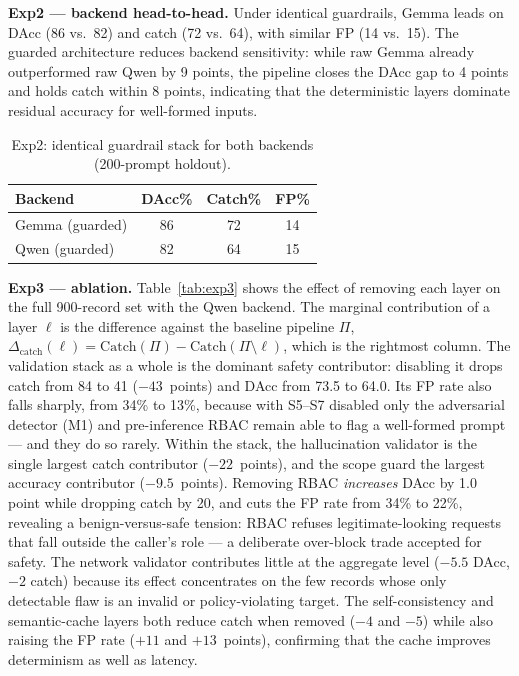 \documentclass[conference]{IEEEtran}
\begin{document}
\textbf{Exp2 --- backend head-to-head.} Under identical guardrails, Gemma leads on DAcc (86 vs.\ 82) and catch (72 vs.\ 64), with similar FP (14 vs.\ 15). The guarded architecture reduces backend sensitivity: while raw Gemma already outperformed raw Qwen by 9 points, the pipeline closes the DAcc gap to 4 points and holds catch within 8 points, indicating that the deterministic layers dominate residual accuracy for well-formed inputs.

\begin{table}[!t]
\centering
\caption{Exp2: identical guardrail stack for both backends (200-prompt holdout).}
\label{tab:exp2}
\setlength{\tabcolsep}{4pt}
\small
\begin{tabular}{@{}lccc@{}}
\toprule
\textbf{Backend} & \textbf{DAcc\%} & \textbf{Catch\%} & \textbf{FP\%} \\
\midrule
Gemma (guarded) & 86 & 72 & 14 \\
Qwen (guarded)  & 82 & 64 & 15 \\
\bottomrule
\end{tabular}
\end{table}

\textbf{Exp3 --- ablation.} Table~\ref{tab:exp3} shows the effect of removing each layer on the full 900-record set with the Qwen backend. The marginal contribution of a layer $\ell$ is the difference against the baseline pipeline $\Pi$, $\Delta_{\mathrm{catch}}(\ell) = \mathrm{Catch}(\Pi) - \mathrm{Catch}(\Pi\setminus\ell)$, which is the rightmost column. The validation stack as a whole is the dominant safety contributor: disabling it drops catch from 84 to 41 (${-}43$~points) and DAcc from 73.5 to 64.0. Its FP rate also falls sharply, from 34\% to 13\%, because with S5--S7 disabled only the adversarial detector (M1) and pre-inference RBAC remain able to flag a well-formed prompt --- and they do so rarely. Within the stack, the hallucination validator is the single largest catch contributor (${-}22$~points), and the scope guard the largest accuracy contributor (${-}9.5$~points). Removing RBAC \emph{increases} DAcc by 1.0 point while dropping catch by 20, and cuts the FP rate from 34\% to 22\%, revealing a benign-versus-safe tension: RBAC refuses legitimate-looking requests that fall outside the caller's role --- a deliberate over-block trade accepted for safety. The network validator contributes little at the aggregate level (${-}5.5$ DAcc, ${-}2$ catch) because its effect concentrates on the few records whose only detectable flaw is an invalid or policy-violating target. The self-consistency and semantic-cache layers both reduce catch when removed (${-}4$ and ${-}5$) while also raising the FP rate (${+}11$ and ${+}13$~points), confirming that the cache improves determinism as well as latency.
\end{document}
